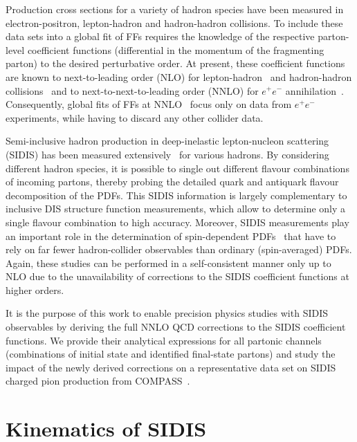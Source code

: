 \documentclass[10pt,aps,prl,twocolumn,preprintnumbers,nofootinbib]{revtex4-2}
\begin{document}
Production cross sections for a variety of hadron species have been measured in
electron-positron, lepton-hadron and hadron-hadron collisions. To include these
data sets into a global fit of FFs requires the knowledge of the respective
parton-level coefficient functions (differential in the momentum of the
fragmenting parton) to the desired perturbative order. At present, these
coefficient functions are known to next-to-leading order (NLO) for
lepton-hadron~\cite{Altarelli:1979kv,Baier:1979sp,deFlorian:1997zj} and
hadron-hadron collisions~\cite{Aversa:1988vb} and to next-to-next-to-leading
order (NNLO) for $e^+e^-$ annihilation~\cite{Rijken:1996ns,Mitov:2006ic}.
Consequently, global fits of FFs at
NNLO~\cite{Bertone:2017tyb,Anderle:2015lqa,Abdolmaleki:2021yjf} focus only on
data from $e^+e^-$ experiments, while having to discard any other collider data.

Semi-inclusive hadron production in deep-inelastic lepton-nucleon scattering
(SIDIS) has been measured
extensively~\cite{EuropeanMuon:1991sne,ZEUS:1995acw,H1:1996muf,HERMES:2012uyd,COMPASS:2016xvm}
for various hadrons.  By considering different hadron species, it is possible to
single out different flavour combinations of incoming partons, thereby probing
the detailed quark and antiquark flavour decomposition of the PDFs. This SIDIS
information is largely complementary to inclusive DIS structure function
measurements, which allow to determine only a single flavour combination to high
accuracy. Moreover, SIDIS measurements play an important role in the
determination of spin-dependent PDFs~\cite{deFlorian:2009vb} that have to rely
on far fewer hadron-collider observables than ordinary (spin-averaged) PDFs.
Again, these studies can be performed in a self-consistent manner only up to NLO
due to the unavailability of corrections to the SIDIS coefficient functions at
higher orders.

It is the purpose of this work to enable precision physics studies with SIDIS
observables by deriving the full NNLO QCD corrections to the SIDIS coefficient
functions. We provide their analytical expressions for all partonic channels
(combinations of initial state and identified final-state partons) and study the
impact of the newly derived corrections on a representative data set on SIDIS
charged pion production from COMPASS~\cite{COMPASS:2016xvm}.

\section{Kinematics of SIDIS}
\end{document}
